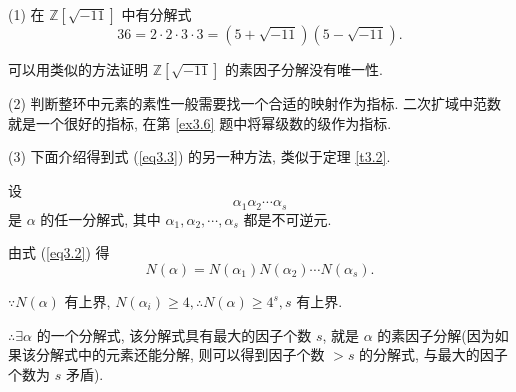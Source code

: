 \documentclass[color=black,device=normal,lang=cn,mode=geye]{elegantnote}
\begin{document}
\begin{note}
    (1) 在 $\mathbb{Z}[\sqrt{-11}]$ 中有分解式
    \[36=2\cdot2\cdot3\cdot3=(5+\sqrt{-11})(5-\sqrt{-11}).\]

    可以用类似的方法证明 $\mathbb{Z}[\sqrt{-11}]$ 的素因子分解没有唯一性.
    
    (2) 判断整环中元素的素性一般需要找一个合适的映射作为指标. 二次扩域中范数就是一个很好的指标, 在第 \ref{ex3.6} 题中将幂级数的级作为指标.

    (3) 下面介绍得到式 (\ref{eq3.3}) 的另一种方法, 类似于定理 \ref{t3.2}.

    设
    \[\alpha_1\alpha_2\cdots\alpha_s\]
    是 $\alpha$ 的任一分解式, 其中 $\alpha_1,\alpha_2,\cdots,\alpha_s$ 都是不可逆元.

    由式 (\ref{eq3.2}) 得
    \[N(\alpha)=N(\alpha_1)N(\alpha_2)\cdots N(\alpha_s).\]

    $\because N(\alpha)$ 有上界, $N(\alpha_i)\geq4,\therefore N(\alpha)\geq 4^s,s$ 有上界.

    $\therefore\exists\alpha$ 的一个分解式, 该分解式具有最大的因子个数 $s$, 就是 $\alpha$ 的素因子分解(因为如果该分解式中的元素还能分解, 则可以得到因子个数 $>s$ 的分解式, 与最大的因子个数为 $s$ 矛盾).
\end{note}
\end{document}
